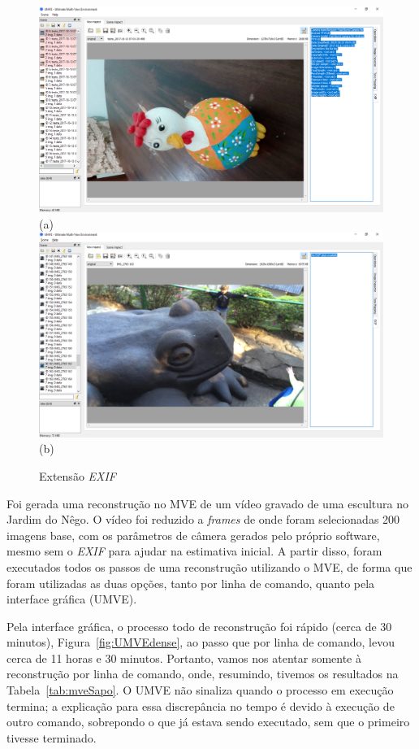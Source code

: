 \begin{figure}[!htpb]
	\centering
	\caption{Extensão \emph{EXIF}}
	\includegraphics[width=0.35\linewidth]{figs/exifumve.png}(a)
	\includegraphics[width=0.35\linewidth]{figs/exifsemumve.png}(b)
	\label{fig:mveexif}
\end{figure} 

Foi gerada uma reconstrução no MVE de um vídeo gravado de uma escultura no Jardim do
Nêgo. O  vídeo foi reduzido a \emph{frames} de onde foram selecionadas 200 imagens base,
com os parâmetros de câmera gerados pelo próprio software, mesmo sem o
\emph{EXIF} para ajudar na estimativa inicial. 
A partir disso, foram executados todos os passos de uma reconstrução utilizando o
MVE, de forma que foram utilizadas as duas opções, tanto por linha de comando,
quanto pela interface gráfica (UMVE).

Pela interface gráfica, o processo todo de reconstrução foi rápido (cerca de 30
minutos), Figura~\ref{fig:UMVEdense}, ao passo que por linha de comando, levou cerca de
11 horas e 30 minutos. Portanto, vamos nos atentar somente à reconstrução por
linha de comando, onde, resumindo, tivemos os resultados na Tabela~\ref{tab:mveSapo}. 
O UMVE não sinaliza quando o processo em execução termina; a explicação
para essa discrepância no tempo é devido à execução de outro comando, sobrepondo
o que já estava sendo executado, sem que o primeiro tivesse terminado.

